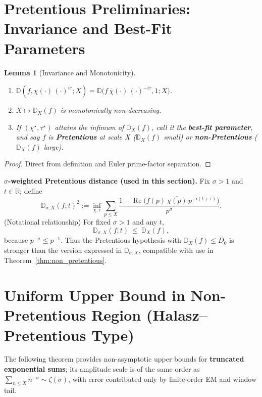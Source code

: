 \documentclass[11pt,a4paper]{article}
\newtheorem{lemma}[theorem]{Lemma}
\theoremstyle{remark}
\DeclareMathOperator{\Re}{Re}
\begin{document}
\section{Pretentious Preliminaries: Invariance and Best-Fit Parameters}

\begin{lemma}[Invariance and Monotonicity]\label{lem:pretentious_prelim}
\begin{enumerate}
\item[(1)] $\mathbb{D}(f,\chi(\cdot)\,(\cdot)^{i\tau};X)=\mathbb{D}\bigl(f\,\overline{\chi}(\cdot)\,(\cdot)^{-i\tau},1;X\bigr)$.

\item[(2)] $X\mapsto \mathbb{D}_X(f)$ is monotonically non-decreasing.

\item[(3)] If $(\chi^\star,\tau^\star)$ attains the infimum of $\mathbb{D}_X(f)$, call it the \textbf{best-fit parameter}, and say $f$ is \textbf{Pretentious} at scale $X$ ($\mathbb{D}_X(f)$ small) or \textbf{non-Pretentious} ($\mathbb{D}_X(f)$ large).
\end{enumerate}
\end{lemma}

\begin{proof}
Direct from definition and Euler prime-factor separation.
\end{proof}

\textbf{$\sigma$-weighted Pretentious distance (used in this section).} Fix $\sigma>1$ and $t\in\mathbb{R}$; define
\begin{equation}
\mathbb{D}_{\sigma,X}(f;t)^2:=\inf_{\chi,\tau}\sum_{p\le X}\frac{1-\Re\!\bigl(f(p)\,\overline{\chi(p)}\,p^{-i(t+\tau)}\bigr)}{p^{\sigma}}.
\end{equation}
(Notational relationship) For fixed $\sigma>1$ and any $t$,
\begin{equation}
\mathbb{D}_{\sigma,X}(f;t)\ \le\ \mathbb{D}_X(f),
\end{equation}
because $p^{-\sigma}\le p^{-1}$. Thus the Pretentious hypothesis with $\mathbb{D}_X(f)\le D_0$ is stronger than the version expressed in $\mathbb{D}_{\sigma,X}$, compatible with use in Theorem~\ref{thm:non_pretentious}.

\section{Uniform Upper Bound in Non-Pretentious Region (Halasz--Pretentious Type)}

The following theorem provides non-asymptotic upper bounds for \textbf{truncated exponential sums}; its amplitude scale is of the same order as $\sum_{n\le X}n^{-\sigma}\sim \zeta(\sigma)$, with error contributed only by finite-order EM and window tail.
\end{document}
